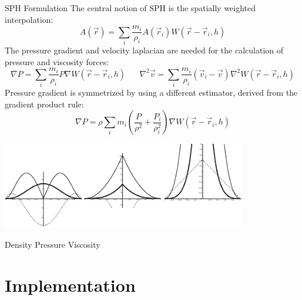 \documentclass[8pt,sans,mathserif,aspectratio=43]{beamer}
\begin{document}
\begin{frame}{SPH Formulation}
  The central notion of SPH is the spatially weighted interpolation:
  \begin{equation*}
    A(\vec{r}) = \sum_i \frac{m_i}{\rho_i} A(\vec{r}_i) W(\vec{r}-\vec{r}_i, h)
  \end{equation*}
  \pause The pressure gradient and velocity laplacian are needed for the
  calculation of pressure and viscosity forces:
  \begin{equation*}
    \nabla P = \sum_i \frac{m_i}{\rho_i} P \nabla W(\vec{r} - \vec{r}_i, h)
    \hspace{20pt}
    \nabla^2\vec{v} = \sum_i \frac{m_i}{\rho_i} (\vec{v}_i - \vec{v}) \nabla^2
    W(\vec{r}-\vec{r}_i, h)
  \end{equation*}
  \pause Pressure gradient is symmetrized by using a different estimator,
  derived from the gradient product rule:
  \begin{equation*}
    \nabla P = \rho \sum_i m_i \left(\frac{P}{\rho^2} + \frac{P_i}{\rho_i^2} \right)
    \nabla W(\vec{r}-\vec{r}_i, h)
  \end{equation*}
  \pause
  \begin{center}
    \vspace{-25pt}
    \includegraphics[width=0.8\textwidth]{figures/smoothing-kernels.pdf}\\
    \vspace{-10pt}
  \end{center}
  \hspace{66pt} Density \hspace{66pt} Pressure \hspace{66pt} Viscosity
\end{frame}


\section{Implementation}
\end{document}
